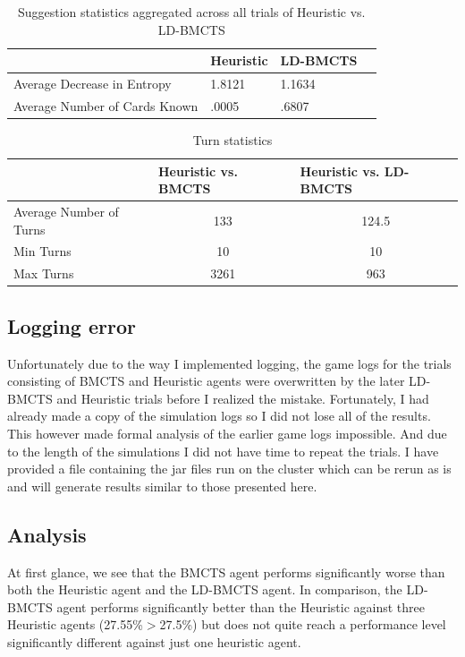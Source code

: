 \documentclass[msc, ai, twoside, notimes, logo, parskip, leftchapter, normalheadings]{infthesis}
\begin{document}
\begin{table}[H]
\centering
\caption{Suggestion statistics aggregated across all trials of Heuristic vs. LD-BMCTS}
\begin{tabular}{l|lll}
& \multicolumn{1}{l|}{Heuristic} & LD-BMCTS \\ \hline \hline
Average Decrease in Entropy & 1.8121 & 1.1634 \\
Average Number of Cards Known & .0005 & .6807 \\
\end{tabular}
\end{table}

\begin{table}[H]
\centering
\caption{Turn statistics}
\begin{tabular}{l|ll}
& \multicolumn{1}{l|}{Heuristic vs. BMCTS} & \multicolumn{1}{l}{Heuristic vs. LD-BMCTS} \\ \hline \hline
Average Number of Turns & \multicolumn{1}{c}{133} & \multicolumn{1}{c}{124.5} \\
Min Turns & \multicolumn{1}{c}{10} & \multicolumn{1}{c}{10} \\
Max Turns & \multicolumn{1}{c}{3261} & \multicolumn{1}{c}{963}
\end{tabular}
\end{table}


\subsection{Logging error}
Unfortunately due to the way I implemented logging, the game logs for the trials consisting of BMCTS and Heuristic agents were overwritten by the later LD-BMCTS and Heuristic trials before I realized the mistake. Fortunately, I had already made a copy of the simulation logs so I did not lose all of the results. This however made formal analysis of the earlier game logs impossible. And due to the length of the simulations I did not have time to repeat the trials. I have provided a file containing the jar files run on the cluster which can be rerun as is and will generate results similar to those presented here.

\subsection{Analysis}
At first glance, we see that the BMCTS agent performs significantly worse than both the Heuristic agent and the LD-BMCTS agent. In comparison, the LD-BMCTS agent performs significantly better than the Heuristic against three Heuristic agents (27.55\%\(>\)27.5\%) but does not quite reach a performance level significantly different against just one heuristic agent. 
\end{document}
